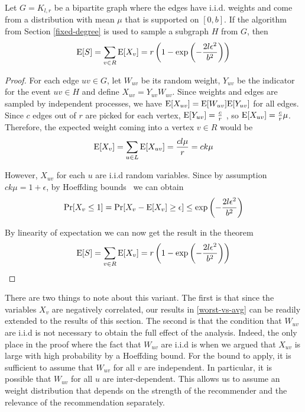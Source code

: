 \begin{thm}
Let $G=K_{l,r}$ be a bipartite graph where the edges have i.i.d. weights and come from a distribution with mean $\mu$ that is supported on $[0,b]$. If the algorithm from Section \ref{fixed-degree} is used to sample a subgraph $H$ from $G$, then
\[ \text{E}[S] = \sum_{v\in R} \text{E}[X_v] = r\left(1-\exp\left(-\frac{2l\epsilon^2}{b^2}\right)\right) \]
\end{thm}

\begin{proof}
For each edge $uv\in G$, let $W_{uv}$ be its random weight, $Y_{uv}$ be
the indicator for the event $uv\in H$ and define $X_{uv} = Y_{uv}
W_{uv}$. Since weights and edges are sampled by independent processes,
we have $\text{E}[X_{uv}] = \text{E}[W_{uv}]\text{E}[Y_{uv}]$ for all edges. Since $c$
edges out of $r$ are picked for each vertex, $\text{E}[Y_{uv}] = \frac{c}{r}$
, so $\text{E}[X_{uv}] = \frac{c}{r}\mu$. Therefore, the expected weight
coming into a vertex $v\in R$ would be 
\[ \text{E}[X_v] = \sum_{u\in L} \text{E}[X_{uv}] = \frac{cl\mu}{r} = ck\mu\]

However, $X_{uv}$ for each $u$ are i.i.d random variables. Since by
assumption $ck\mu = 1+\epsilon$, by Hoeffding bounds~\cite{Hoeffding1963} 
we can obtain
\[ \Pr[X_v \leq 1] = \Pr[X_v - \text{E}[X_v] \geq \epsilon] \leq \exp\left(-\frac{2l\epsilon^2}{b^2}\right) \]

By linearity of expectation we can now get the result in the theorem
\[ \text{E}[S] = \sum_{v\in R} \text{E}[X_v] = r\left(1-\exp\left(-\frac{2l\epsilon^2}{b^2}\right)\right) \]
\end{proof}

There are two things to note about this variant. The first is that
since the variables $X_v$ are negatively correlated, our results in
\ref{worst-vs-avg} can be readily extended to the results of this
section. The second is that the condition that $W_{uv}$ are i.i.d
is not necessary to obtain the full effect of the analysis. Indeed,
the only place in the proof where the fact that $W_{uv}$ are i.i.d
is when we argued that $X_{uv}$ is large with high probability by a
Hoeffding bound. For the bound to apply, it is sufficient to assume
that $W_{uv}$ for all $v$ are independent. In particular, it is 
possible that $W_{uv}$ for all $u$ are inter-dependent. This allows
us to assume an weight distribution that depends on the strength of 
the recommender and the relevance of the recommendation separately.
